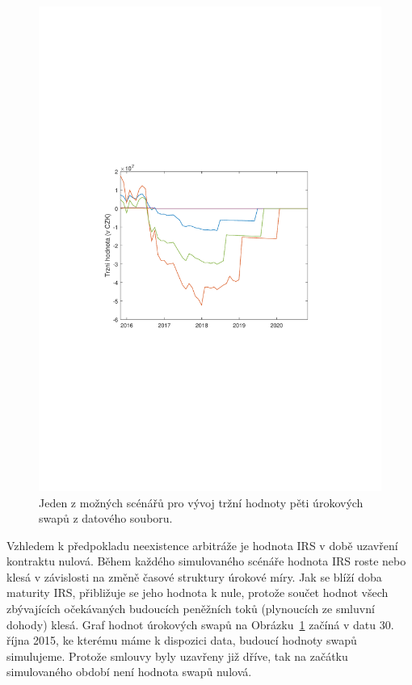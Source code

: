 \documentclass[a4paper,12pt]{report}
\theoremstyle{definition} \newtheorem{definice}[veta]{Definice}
\theoremstyle{remark}
\begin{document}
\begin{figure}[!htbp]
  \centering 
	\includegraphics[width=13cm, clip, trim= 90 270 110 270]{IMG/Trzni_hodnota.pdf}
     \caption{Jeden z možných scénářů pro vývoj tržní hodnoty pěti úrokových swapů z datového souboru.}  \label{SwapPrice}
\end{figure}

Vzhledem k předpokladu neexistence arbitráže je hodnota IRS v době uzavření kontraktu nulová. 
Během každého simulovaného scénáře hodnota IRS roste nebo klesá v závislosti na změně časové struktury úrokové míry.
Jak se blíží doba maturity IRS, přibližuje se jeho hodnota k nule, protože součet hodnot všech zbývajících očekávaných budoucích peněžních toků (plynoucích ze smluvní dohody) klesá.   
Graf hodnot úrokových swapů na Obrázku~\ref{SwapPrice} začíná v datu 30. října 2015, ke kterému máme k dispozici data, budoucí hodnoty swapů simulujeme.
Protože smlouvy byly uzavřeny již dříve, tak na začátku simulovaného období není hodnota swapů nulová.
\end{document}
